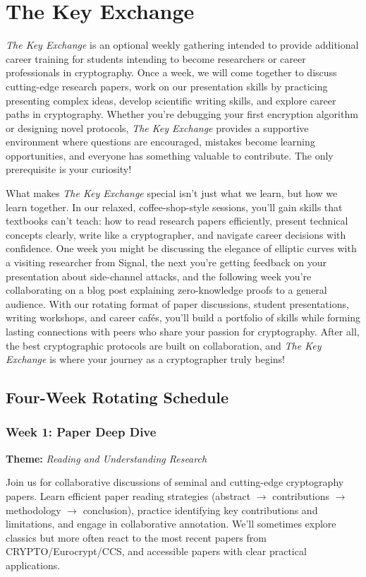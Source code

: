 \documentclass[10pt,a4paper,american]{exam}
\begin{document}
\section{The Key Exchange}
\textit{The Key Exchange} is an optional weekly gathering intended to provide additional career training for students intending to become researchers or career professionals in cryptography. Once a week, we will come together to discuss cutting-edge research papers, work on our presentation skills by practicing presenting complex ideas, develop scientific writing skills, and explore career paths in cryptography. Whether you're debugging your first encryption algorithm or designing novel protocols, \textit{The Key Exchange} provides a supportive environment where questions are encouraged, mistakes become learning opportunities, and everyone has something valuable to contribute. The only prerequisite is your curiosity!

What makes \textit{The Key Exchange} special isn't just what we learn, but how we learn together. In our relaxed, coffee-shop-style sessions, you'll gain skills that textbooks can't teach: how to read research papers efficiently, present technical concepts clearly, write like a cryptographer, and navigate career decisions with confidence. One week you might be discussing the elegance of elliptic curves with a visiting researcher from Signal, the next you're getting feedback on your presentation about side-channel attacks, and the following week you're collaborating on a blog post explaining zero-knowledge proofs to a general audience. With our rotating format of paper discussions, student presentations, writing workshops, and career cafés, you'll build a portfolio of skills while forming lasting connections with peers who share your passion for cryptography. After all, the best cryptographic protocols are built on collaboration, and \textit{The Key Exchange} is where your journey as a cryptographer truly begins!

\subsection{Four-Week Rotating Schedule}

\subsubsection*{Week 1: Paper Deep Dive}
\textbf{Theme:} \textit{Reading and Understanding Research}

Join us for collaborative discussions of seminal and cutting-edge cryptography papers. Learn efficient paper reading strategies (abstract $\rightarrow$ contributions $\rightarrow$ methodology $\rightarrow$ conclusion), practice identifying key contributions and limitations, and engage in collaborative annotation. We'll sometimes explore classics but more often react to the most recent papers from CRYPTO/Eurocrypt/CCS, and accessible papers with clear practical applications.
\end{document}
